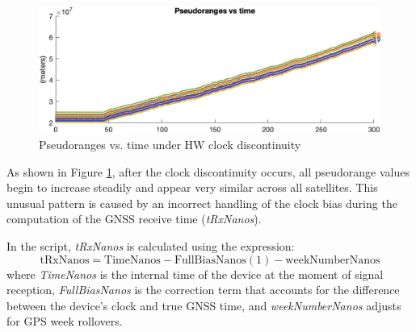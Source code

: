 \begin{figure}[H]
    \centering
    \includegraphics[width=0.75\linewidth]{images/disontinuity_pseudorange_vs_time.png}
    \caption{Pseudoranges vs. time under HW clock discontinuity}
    \label{fig:disontinuity_pseudorange_vs_time}
\end{figure}

As shown in Figure \ref{fig:disontinuity_pseudorange_vs_time}, after the clock discontinuity occurs, all pseudorange values begin to increase steadily and appear very similar across all satellites. This unusual pattern is caused by an incorrect handling of the clock bias during the computation of the GNSS receive time (\textit{tRxNanos}).

In the script, \textit{tRxNanos} is calculated using the expression:
\begin{equation*}
    \label{eq:tRxNanos}
    \text{tRxNanos} = \text{TimeNanos} - \text{FullBiasNanos}(1) - \text{weekNumberNanos}
\end{equation*}
where \textit{TimeNanos} is the internal time of the device at the moment of signal reception, \textit{FullBiasNanos} is the correction term that accounts for the difference between the device’s clock and true GNSS time, and \textit{weekNumberNanos} adjusts for GPS week rollovers.

